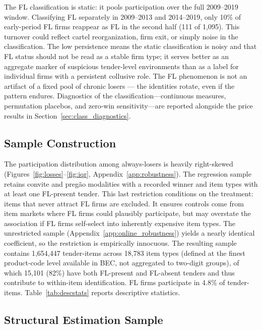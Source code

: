 The FL classification is static: it pools participation over the full
2009--2019 window. Classifying FL separately in 2009--2013 and
2014--2019, only 10\% of early-period FL firms reappear as FL in the
second half (111 of 1,095). This turnover could reflect cartel
reorganization, firm exit, or simply noise in the classification. The low persistence means the static classification is noisy and that
FL status should not be read as a stable firm type; it serves better
as an aggregate marker of suspicious tender-level environments than
as a label for individual firms with a persistent collusive role. The
FL phenomenon is not an artifact of a fixed pool of chronic losers
--- the identities rotate, even if the pattern endures. Diagnostics
of the classification---continuous measures, permutation placebos, and
zero-win sensitivity---are reported alongside the price results in
Section~\ref{sec:class_diagnostics}.

\subsection{Sample Construction}
\label{sec:sample}

The participation distribution among always-losers is heavily
right-skewed (Figures~\ref{fig:losses}--\ref{fig:iqr},
Appendix~\ref{app:robustness}).
The regression sample retains convite and preg\~ao modalities with a
recorded winner and item types with at least one FL-present tender.
This last restriction conditions on the treatment: items that never
attract FL firms are excluded. It ensures controls come from item
markets where FL firms could plausibly participate, but may overstate
the association if FL firms self-select into inherently expensive
item types. The unrestricted sample
(Appendix~\ref{app:online_robustness}) yields a nearly identical
coefficient, so the restriction is empirically innocuous.
The resulting sample contains 1,654,447 tender-items across 18,783
item types (defined at the finest product-code level available in BEC,
not aggregated to two-digit groups), of which 15,101 (82\%) have both
FL-present and FL-absent tenders and thus contribute to within-item
identification. FL firms
participate in 4.8\% of tender-items.
Table~\ref{tab:descstats} reports descriptive statistics.



\subsection{Structural Estimation Sample}
\label{sec:structural_sample}

